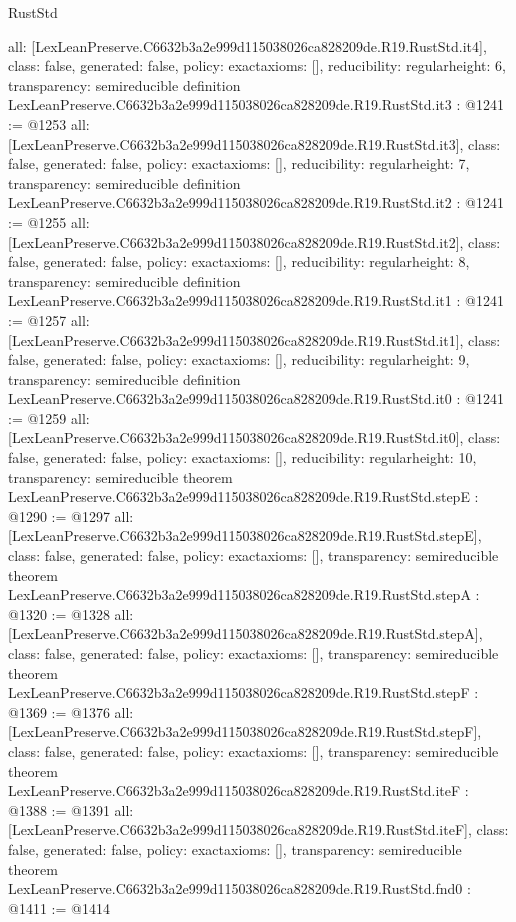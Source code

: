 \begin{lexlean}{RustStd}
\begin{coremodule}
{  all: [LexLeanPreserve.C6632b3a2e999d115038026ca828209de.R19.RustStd.it4],
  class: false,
  generated: false,
  policy: exact{axioms: []},
  reducibility: regular{height: 6},
  transparency: semireducible
}
definition LexLeanPreserve.C6632b3a2e999d115038026ca828209de.R19.RustStd.it3 : @1241 := @1253 {
  all: [LexLeanPreserve.C6632b3a2e999d115038026ca828209de.R19.RustStd.it3],
  class: false,
  generated: false,
  policy: exact{axioms: []},
  reducibility: regular{height: 7},
  transparency: semireducible
}
definition LexLeanPreserve.C6632b3a2e999d115038026ca828209de.R19.RustStd.it2 : @1241 := @1255 {
  all: [LexLeanPreserve.C6632b3a2e999d115038026ca828209de.R19.RustStd.it2],
  class: false,
  generated: false,
  policy: exact{axioms: []},
  reducibility: regular{height: 8},
  transparency: semireducible
}
definition LexLeanPreserve.C6632b3a2e999d115038026ca828209de.R19.RustStd.it1 : @1241 := @1257 {
  all: [LexLeanPreserve.C6632b3a2e999d115038026ca828209de.R19.RustStd.it1],
  class: false,
  generated: false,
  policy: exact{axioms: []},
  reducibility: regular{height: 9},
  transparency: semireducible
}
definition LexLeanPreserve.C6632b3a2e999d115038026ca828209de.R19.RustStd.it0 : @1241 := @1259 {
  all: [LexLeanPreserve.C6632b3a2e999d115038026ca828209de.R19.RustStd.it0],
  class: false,
  generated: false,
  policy: exact{axioms: []},
  reducibility: regular{height: 10},
  transparency: semireducible
}
theorem LexLeanPreserve.C6632b3a2e999d115038026ca828209de.R19.RustStd.stepE : @1290 := @1297 {
  all: [LexLeanPreserve.C6632b3a2e999d115038026ca828209de.R19.RustStd.stepE],
  class: false,
  generated: false,
  policy: exact{axioms: []},
  transparency: semireducible
}
theorem LexLeanPreserve.C6632b3a2e999d115038026ca828209de.R19.RustStd.stepA : @1320 := @1328 {
  all: [LexLeanPreserve.C6632b3a2e999d115038026ca828209de.R19.RustStd.stepA],
  class: false,
  generated: false,
  policy: exact{axioms: []},
  transparency: semireducible
}
theorem LexLeanPreserve.C6632b3a2e999d115038026ca828209de.R19.RustStd.stepF : @1369 := @1376 {
  all: [LexLeanPreserve.C6632b3a2e999d115038026ca828209de.R19.RustStd.stepF],
  class: false,
  generated: false,
  policy: exact{axioms: []},
  transparency: semireducible
}
theorem LexLeanPreserve.C6632b3a2e999d115038026ca828209de.R19.RustStd.iteF : @1388 := @1391 {
  all: [LexLeanPreserve.C6632b3a2e999d115038026ca828209de.R19.RustStd.iteF],
  class: false,
  generated: false,
  policy: exact{axioms: []},
  transparency: semireducible
}
theorem LexLeanPreserve.C6632b3a2e999d115038026ca828209de.R19.RustStd.fnd0 : @1411 := @1414 {
}
\end{coremodule}
\end{lexlean}
